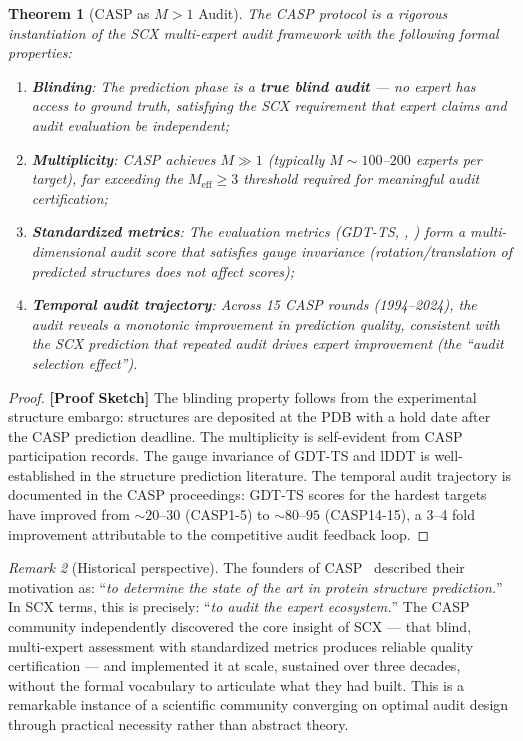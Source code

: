 \documentclass[12pt,a4paper]{article}
\newtheorem{theorem}{Theorem}[section]
\theoremstyle{remark}
\newtheorem{remark}[theorem]{Remark}
\DeclareMathOperator{\TMscore}{TM\text{-}score}
\DeclareMathOperator{\lDDT}{lDDT}
\newcommand{\rigorSketch}{\textbf{[Proof Sketch]}}
\begin{document}
\begin{theorem}[CASP as $M > 1$ Audit]
\label{thm:casp-audit}
The CASP protocol is a rigorous instantiation of the SCX multi-expert audit framework with the following formal properties:
\begin{enumerate}[leftmargin=*,label=(\roman*)]
    \item \textbf{Blinding}: The prediction phase is a \textbf{true blind audit} — no expert has access to ground truth, satisfying the SCX requirement that expert claims and audit evaluation be independent;
    \item \textbf{Multiplicity}: CASP achieves $M \gg 1$ (typically $M \sim 100$--$200$ experts per target), far exceeding the $M_{\text{eff}} \geq 3$ threshold required for meaningful audit certification;
    \item \textbf{Standardized metrics}: The evaluation metrics (GDT-TS, \lDDT, \TMscore) form a multi-dimensional audit score that satisfies gauge invariance (rotation/translation of predicted structures does not affect scores);
    \item \textbf{Temporal audit trajectory}: Across 15 CASP rounds (1994--2024), the audit reveals a monotonic improvement in prediction quality, consistent with the SCX prediction that repeated audit drives expert improvement (the ``audit selection effect'').
\end{enumerate}
\end{theorem}

\begin{proof}
\rigorSketch
The blinding property follows from the experimental structure embargo: structures are deposited at the PDB with a hold date after the CASP prediction deadline.
The multiplicity is self-evident from CASP participation records.
The gauge invariance of GDT-TS and lDDT is well-established in the structure prediction literature.
The temporal audit trajectory is documented in the CASP proceedings: GDT-TS scores for the hardest targets have improved from $\sim 20$--$30$ (CASP1-5) to $\sim 80$--$95$ (CASP14-15), a 3--4 fold improvement attributable to the competitive audit feedback loop.
\end{proof}

\begin{remark}[Historical perspective]
The founders of CASP~\cite{moult1995large} described their motivation as: ``\textit{to determine the state of the art in protein structure prediction.}''
In SCX terms, this is precisely: ``\textit{to audit the expert ecosystem.}''
The CASP community independently discovered the core insight of SCX — that blind, multi-expert assessment with standardized metrics produces reliable quality certification — and implemented it at scale, sustained over three decades, without the formal vocabulary to articulate what they had built.
This is a remarkable instance of a scientific community converging on optimal audit design through practical necessity rather than abstract theory.
\end{remark}
\end{document}
